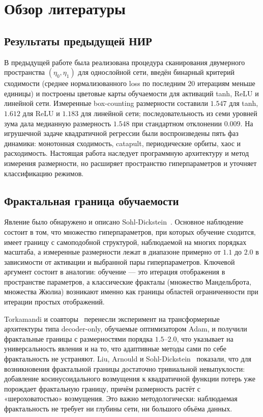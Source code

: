 \section{Обзор литературы}\label{sec:review}

\subsection{Результаты предыдущей НИР}

В предыдущей работе была реализована процедура сканирования двумерного
пространства $(\eta_0,\eta_1)$ для однослойной сети, введён бинарный критерий
сходимости (среднее нормализованного loss по последним 20 итерациям меньше
единицы) и построены цветовые карты обучаемости для активаций tanh, ReLU и
линейной сети. Измеренные box-counting размерности составили $1.547$ для tanh,
$1.612$ для ReLU и $1.183$ для линейной сети; последовательность из семи уровней
зума дала медианную размерность $1.548$ при стандартном отклонении $0.009$.
На игрушечной задаче квадратичной регрессии были воспроизведены пять фаз
динамики: монотонная сходимость, catapult, периодические орбиты, хаос и
расходимость. Настоящая работа наследует программную архитектуру и метод
измерения размерности, но расширяет пространство гиперпараметров и уточняет
классификацию режимов.

\subsection{Фрактальная граница обучаемости}

Явление было обнаружено и описано Sohl-Dickstein~\cite{sohl2024}. Основное
наблюдение состоит в том, что множество гиперпараметров, при которых обучение
сходится, имеет границу с самоподобной структурой, наблюдаемой на многих
порядках масштаба, а измеренные размерности лежат в диапазоне примерно от
$1.1$ до $2.0$ в зависимости от активации и выбранной пары гиперпараметров.
Ключевой аргумент состоит в аналогии: обучение --- это итерация отображения
в пространстве параметров, а классические фракталы (множество Мандельброта,
множества Жюлиа) возникают именно как границы областей ограниченности при
итерации простых отображений.

Torkamandi и соавторы~\cite{torkamandi2025} перенесли эксперимент на
трансформерные архитектуры типа decoder-only, обучаемые оптимизатором Adam, и
получили фрактальные границы с размерностями порядка $1.5$--$2.0$, что
указывает на универсальность явления и на то, что адаптивные методы сами по
себе фрактальность не устраняют. Liu, Arnould и Sohl-Dickstein~\cite{liu2024}
показали, что для возникновения фрактальной границы достаточно тривиальной
невыпуклости: добавление косинусоидального возмущения к квадратичной функции
потерь уже порождает фрактальную границу, причём размерность растёт с
«шероховатостью» возмущения. Это важно методологически: наблюдаемая
фрактальность не требует ни глубины сети, ни большого объёма данных.


